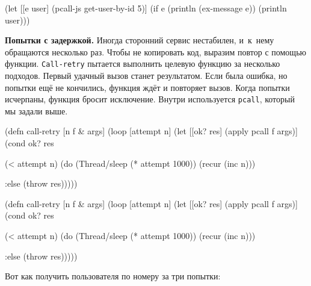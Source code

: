 \else

\begin{english}
  \begin{clojure}
(let [[e user] (pcall-js get-user-by-id 5)]
  (if e
    (println (ex-message e))
    (println user)))
  \end{clojure}
\end{english}

\fi


\textbf{Попытки с задержкой.} Иногда сторонний сервис нестабилен, и~к~нему
обращаются несколько раз. Чтобы не копировать код, выразим повтор с помощью
функции. \verb|Call-retry| пытается выполнить целевую функцию за несколько
подходов. Первый удачный вызов станет результатом. Если была ошибка, но попытки
ещё не кончились, функция ждёт и повторяет вызов. Когда попытки исчерпаны,
функция бросит исключение. Внутри используется \verb|pcall|, который мы задали
выше.


\ifnarrow

\begin{english}
  \begin{clojure}
(defn call-retry [n f & args]
  (loop [attempt n]
    (let [[ok? res] (apply pcall f args)]
      (cond
        ok? res

        (< attempt n)
        (do (Thread/sleep
              (* attempt 1000))
            (recur (inc n)))

        :else (throw res)))))
  \end{clojure}
\end{english}

\else

\begin{english}
  \begin{clojure}
(defn call-retry [n f & args]
  (loop [attempt n]
    (let [[ok? res] (apply pcall f args)]
      (cond
        ok? res

        (< attempt n)
        (do (Thread/sleep (* attempt 1000))
            (recur (inc n)))

        :else (throw res)))))
  \end{clojure}
\end{english}

\fi

\pagebreaklarge[3]

Вот как получить пользователя по номеру за три попытки:

